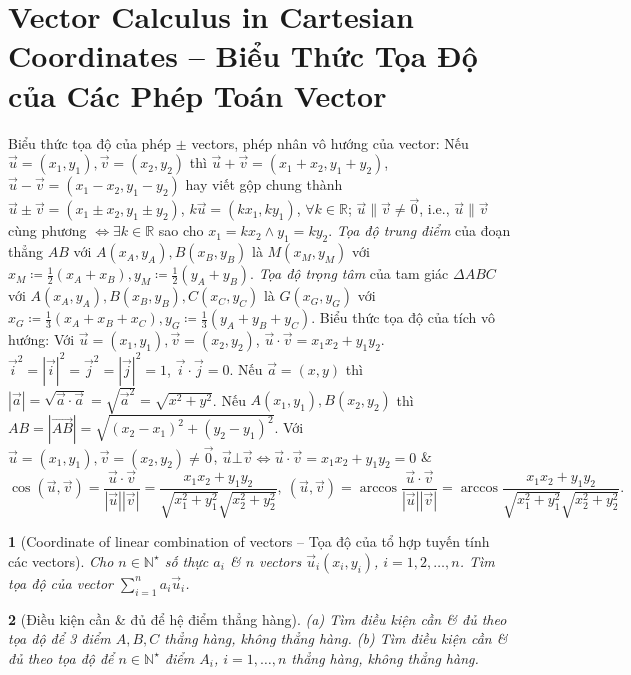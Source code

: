 \documentclass{article}
\newtheorem{baitoan}{}
\begin{document}
\section{Vector Calculus in Cartesian Coordinates -- Biểu Thức Tọa Độ của Các Phép Toán Vector}
 {\sf Biểu thức tọa độ của phép $\pm$ vectors, phép nhân vô hướng của vector}: Nếu $\vec{u} = (x_1,y_1),\vec{v} = (x_2,y_2)$ thì $\vec{u} + \vec{v} = (x_1 + x_2,y_1 + y_2)$, $\vec{u} - \vec{v} = (x_1 - x_2,y_1 - y_2)$ hay viết gộp chung thành $\vec{u}\pm\vec{v} = (x_1\pm x_2,y_1\pm y_2)$, $k\vec{u} = (kx_1,ky_1)$, $\forall k\in\mathbb{R}$; $\vec{u}\parallel\vec{v}\ne\vec{0}$, i.e., $\vec{u}\parallel\vec{v}$ cùng phương $\Leftrightarrow\exists k\in\mathbb{R}$ sao cho $x_1 = kx_2\land y_1 = ky_2$.  {\it Tọa độ trung điểm} của đoạn thẳng $AB$ với $A(x_A,y_A),B(x_B,y_B)$ là $M(x_M,y_M)$ với $x_M\coloneqq\frac{1}{2}(x_A + x_B),y_M\coloneqq\frac{1}{2}(y_A + y_B)$.  {\it Tọa độ trọng tâm} của tam giác $\Delta ABC$ với $A(x_A,y_A),B(x_B,y_B),C(x_C,y_C)$ là $G(x_G,y_G)$ với $x_G\coloneqq\frac{1}{3}(x_A + x_B + x_C),y_G\coloneqq\frac{1}{3}(y_A + y_B + y_C)$.  {\sf Biểu thức tọa độ của tích vô hướng}: Với $\vec{u} = (x_1,y_1),\vec{v} = (x_2,y_2)$, $\vec{u}\cdot\vec{v} = x_1x_2 + y_1y_2$. $\vec{i}^2 = |\vec{i}|^2 = \vec{j}^2 = |\vec{j}|^2 = 1$, $\vec{i}\cdot\vec{j} = 0$. Nếu $\vec{a} = (x,y)$ thì $|\vec{a}| = \sqrt{\vec{a}\cdot\vec{a}} = \sqrt{\vec{a}^2} = \sqrt{x^2 + y^2}$. Nếu $A(x_1,y_1),B(x_2,y_2)$ thì $AB = |\overrightarrow{AB}| = \sqrt{(x_2 - x_1)^2 + (y_2 - y_1)^2}$.  Với $\vec{u} = (x_1,y_1),\vec{v} = (x_2,y_2)\ne\vec{0}$, $\vec{u}\bot\vec{v}\Leftrightarrow\vec{u}\cdot\vec{v} = x_1x_2 + y_1y_2 = 0$ \&
\begin{equation}
	\cos(\vec{u},\vec{v}) = \frac{\vec{u}\cdot\vec{v}}{|\vec{u}||\vec{v}|} = \frac{x_1x_2 + y_1y_2}{\sqrt{x_1^2 + y_1^2}\sqrt{x_2^2 + y_2^2}},\ (\vec{u},\vec{v}) = \arccos\frac{\vec{u}\cdot\vec{v}}{|\vec{u}||\vec{v}|} = \arccos\frac{x_1x_2 + y_1y_2}{\sqrt{x_1^2 + y_1^2}\sqrt{x_2^2 + y_2^2}}.
\end{equation}

\begin{baitoan}[Coordinate of linear combination of vectors -- Tọa độ của tổ hợp tuyến tính các vectors]
	Cho $n\in\mathbb{N}^\star$ số thực $a_i$ \& $n$ vectors $\vec{u}_i(x_i,y_i)$, $i = 1,2,\ldots,n$. Tìm tọa độ của vector $\sum_{i=1}^n a_i\vec{u}_i$.
\end{baitoan}

\begin{baitoan}[Điều kiện cần \& đủ để hệ điểm thẳng hàng]
	(a) Tìm điều kiện cần \& đủ theo tọa độ để 3 điểm $A,B,C$ thẳng hàng, không thẳng hàng. (b) Tìm điều kiện cần \& đủ theo tọa độ để $n\in\mathbb{N}^\star$ điểm $A_i$, $i = 1,\ldots,n$ thẳng hàng, không thẳng hàng.
\end{baitoan}
\end{document}
